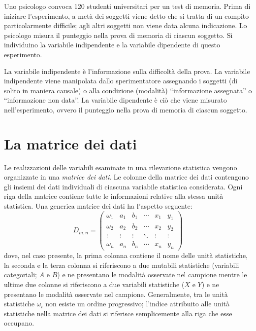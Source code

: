 \begin{exmp}
Uno psicologo convoca 120 studenti universitari per un test di memoria. 
Prima di iniziare l'esperimento, a metà dei soggetti viene detto che si tratta di un compito particolarmente difficile; agli altri soggetti non viene data alcuna indicazione.
Lo psicologo misura il punteggio nella prova di memoria di ciascun soggetto. 
Si individuino la variabile indipendente e la variabile dipendente di questo esperimento.
\end{exmp}

\begin{solu}
La variabile indipendente è l'informazione sulla difficoltà della prova.
La variabile indipendente viene manipolata dallo sperimentatore assegnando i soggetti (di solito in maniera causale) o alla condizione (modalità) \enquote{informazione assegnata} o \enquote{informazione non data}.
La variabile dipendente è ciò che viene misurato nell'esperimento, ovvero il punteggio nella prova di memoria di ciascun soggetto.
\end{solu}


\section{La matrice dei dati}

Le realizzazioni delle variabili esaminate in una rilevazione statistica vengono  organizzate in una \emph{matrice dei dati}. 
Le colonne della matrice dei dati contengono gli insiemi dei dati individuali di ciascuna variabile statistica considerata. 
Ogni riga della matrice contiene tutte le informazioni relative alla stessa unità statistica. 
Una generica matrice dei dati ha l'aspetto seguente:
$$
D_{m,n} = 
 \begin{pmatrix}
  \omega_1 & a_{1}   & b_{1}   & \cdots & x_{1} & y_{1}\\
  \omega_2 & a_{2}   & b_{2}   & \cdots & x_{2} & y_{2}\\
  \vdots   & \vdots  & \vdots  & \ddots & \vdots & \vdots  \\
 \omega_n  & a_{n}   & b_{n}   & \cdots & x_{n} & y_{n}
 \end{pmatrix}
$$
dove, nel caso presente, la prima colonna contiene il nome delle unità statistiche, la seconda e la terza colonna si riferiscono a due mutabili statistiche (variabili categoriali; $A$ e $B$) e ne presentano le modalità osservate nel campione mentre le ultime due colonne si riferiscono a due variabili statistiche ($X$ e $Y$) e ne presentano le modalità osservate nel campione.
Generalmente, tra le unità statistiche $\omega_i$ non esiste un ordine progressivo; l'indice attribuito alle unità statistiche nella matrice dei dati si riferisce semplicemente alla riga che esse occupano.




